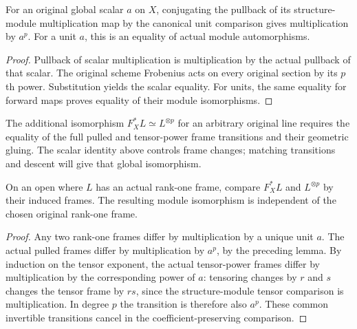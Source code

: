 \begin{lemma}
\label{lem:kn-frobenius-unit-transition}
\leanok
{}
For an original global scalar $a$ on $X$, conjugating the pullback of
its structure-module multiplication map by the canonical unit
comparison gives multiplication by $a^p$.  For a unit $a$, this is an
equality of actual module automorphisms.
\end{lemma}
\begin{proof}
Pullback of scalar multiplication is multiplication by the actual
pullback of that scalar.  The original scheme Frobenius acts on every
original section by its $p$th power.  Substitution yields the scalar
equality.  For units, the same equality for forward maps proves equality
of their module isomorphisms.
\end{proof}

The additional isomorphism $F_X^*L\simeq L^{\otimes p}$ for an
arbitrary original line requires the equality of the full pulled and
tensor-power frame transitions and their geometric gluing.  The scalar
identity above controls frame changes; matching transitions and descent
will give that global isomorphism.

\begin{lemma}
\label{lem:kn-frobenius-frame-independence}
\leanok
{}
On an open where $L$ has an actual rank-one frame, compare $F_X^*L$
and $L^{\otimes p}$ by their induced frames.  The resulting module
isomorphism is independent of the chosen original rank-one frame.
\end{lemma}
\begin{proof}
Any two rank-one frames differ by multiplication by a unique unit $a$.
The actual pulled frames differ by multiplication by $a^p$, by the
preceding lemma.  By induction on the tensor exponent, the actual
tensor-power frames differ by multiplication by the corresponding
power of $a$: tensoring changes by $r$ and $s$ changes the tensor frame
by $rs$, since the structure-module tensor comparison is multiplication.
In degree $p$ the transition is therefore also $a^p$.  These common
invertible transitions cancel in the coefficient-preserving comparison.
\end{proof}

